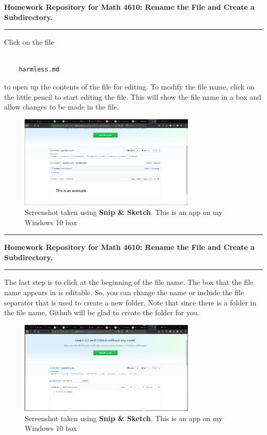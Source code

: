 \documentclass[10pt,fleqn]{article}
\begin{document}
\noindent
{\bf Homework Repository for Math 4610: Rename the File and Create a
 Subdirectory.} 
\vskip0.1in\hrule\vskip0.1in
Click on the file
\begin{verbatim}

    harmless.md

\end{verbatim}
to open up the contents of the file for editing. To modify the file name, click
on the little pencil to start editing the file. This will show the file name in
a box and allow changes to be made in the file.
\vfill
\begin{figure}[h]
\centering
\includegraphics[width=0.75\textwidth]{../images/github_10.png}
\caption{{Screenshot} taken using {\bf Snip \& Sketch}. This is an app on
         my Windows 10 box}
\end{figure}
\eject
\vskip0.1in\hrule\vskip0.1in
\noindent
{\bf Homework Repository for Math 4610: Rename the File and Create a
 Subdirectory.} 
\vskip0.1in\hrule\vskip0.1in
The last step is to click at the beginning of the file name. The box that the
file name appears in is editable. So, you can change the name or include the
file separator that is used to create a new folder. Note that since there is
a folder in the file name, Github will be glad to create the folder for you.
\vfill
\begin{figure}[h]
\centering
\includegraphics[width=0.75\textwidth]{../images/github_11.png}
\caption{{Screenshot} taken using {\bf Snip \& Sketch}. This is an app on
         my Windows 10 box}
\end{figure}
\end{document}
